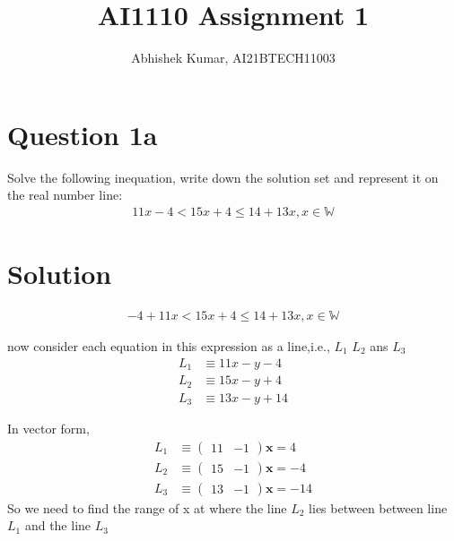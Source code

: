 \documentclass[16pt, a4paper, two column]{article}
\title{AI1110 Assignment 1}
\author{Abhishek Kumar, AI21BTECH11003}
\newcommand{\myvec}[1]{\ensuremath{\begin{pmatrix}#1\end{pmatrix}}}
\let\vec\mathbf
\begin{document}
\maketitle
\section*{Question 1a}
Solve the following inequation, write down the solution set and represent it on the real number line:
\begin{align*}
  11x-4 < 15x + 4 \le 14 + 13x,  x\in \mathbb{W} 
\end{align*}
\section*{Solution}
\begin{align}
  -4 + 11x < 15x + 4 \le 14 + 13x,  x\in \mathbb{W} 
\end{align}


now consider each equation in this expression as a line,i.e., $L_1$ $L_2$ ans $L_3$
\begin{align}
L_1 &\equiv 11x-y-4  \\
L_2 &\equiv 15x-y+4 \\
L_3 &\equiv 13x-y+14
\end{align}

In vector form,
\begin{align}
	L_1 &\equiv \myvec{11 & -1}\vec{x} = 4 \\
	L_2 &\equiv \myvec{15 & -1} \vec{x} = -4 \\
	L_3 &\equiv \myvec{13 & -1}\vec{x} = -14
\end{align}
So we need to find the range of x at where the line $L_2$ lies between between line $L_1$ and the line $L_3$
\end{document}
